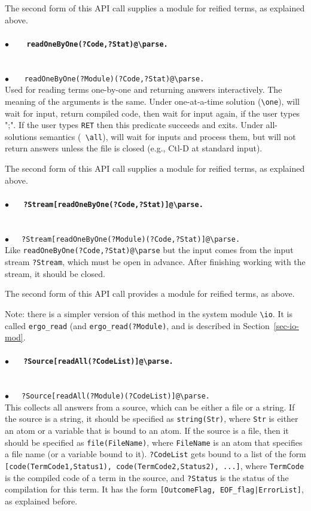 \documentclass[11pt]{article}
\newcommand{\bs}{\textbackslash}
\begin{document}
  \noindent
  The second form of this API call supplies a module for reified terms, as
explained above.
  \paragraph{$\bullet$~~~ \tt  readOneByOne(?Code,?Stat)@\bs{}parse.} ~~\\
{$\bullet$~~~ \tt  readOneByOne(?Module)(?Code,?Stat)@\bs{}parse.} ~~\\
Used for reading terms one-by-one and returning answers interactively.
The meaning of the arguments is the same.  Under one-at-a-time solution
({\tt \bs{}one}), will wait for input, return compiled code, then wait for
input again, if the user types ";". If the user types {\tt RET} then this
predicate succeeds and exits.  Under all-solutions semantics ({\tt
  \bs{}all}), will wait for inputs and process them, but will not return
answers unless the file is closed (e.g., Ctl-D at standard input).

\noindent
The second form of this API call supplies a module for reified terms, as
explained above.

\paragraph{$\bullet$~~~\tt  ?Stream[readOneByOne(?Code,?Stat)]@\bs{}parse.} ~~\\
{$\bullet$~~~\tt  ?Stream[readOneByOne(?Module)(?Code,?Stat)]@\bs{}parse.} ~~\\
Like \texttt{readOneByOne(?Code,?Stat)@\bs{}parse}  but the input comes from
the input stream \texttt{?Stream}, which must be open in advance.
After finishing working with the stream, it should be closed. 

\noindent
The second form of this API call provides a module for reified terms, as
above.

\noindent
Note: there is a simpler version of this method in the system module
\texttt{\bs{}io}. It is called
\texttt{ergo\_read}
(and
\texttt{ergo\_read(?Module)},
and is described in Section~\ref{sec-io-mod}.


\paragraph{$\bullet$~~~\tt  ?Source[readAll(?CodeList)]@\bs{}parse.}~~\\
{$\bullet$~~~\tt ?Source[readAll(?Module)(?CodeList)]@\bs{}parse.}~~\\
This collects all answers from a source, which can be either a file or a
string. If the source is a string, it should be
specified as {\tt string(Str)}, where {\tt Str} is either an atom or a
variable that is bound to an atom. If the source is a file, then it should
be specified as {\tt file(FileName)}, where {\tt FileName} is an atom
that specifies a file name (or a variable bound to it).
{\tt ?CodeList} gets bound to a list
of the form {\tt [code(TermCode1,Status1), code(TermCode2,Status2),
  ...]}, where  
{\tt TermCode} is the compiled code of a term in the source, and
{\tt ?Status}  is the status of the compilation for this term. It has the
form {\tt [OutcomeFlag, EOF\_flag|ErrorList]}, as explained before.
\end{document}
